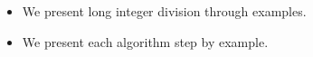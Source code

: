 \begin{frame}
\begin{itemize}
\item We present long integer division through examples.
\item<2-> We present each algorithm step by example.

\end{itemize}
\end{frame}